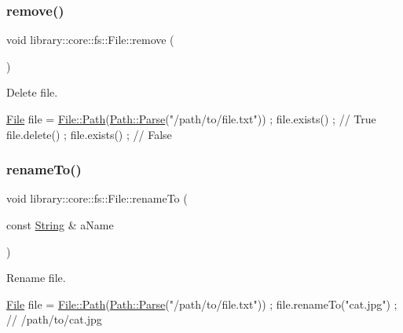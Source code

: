 \subsubsection{\texorpdfstring{remove()}{remove()}}
{\footnotesize\ttfamily void library\+::core\+::fs\+::\+File\+::remove (\begin{DoxyParamCaption}{ }\end{DoxyParamCaption})}



Delete file. 


\begin{DoxyCode}
\hyperlink{classlibrary_1_1core_1_1fs_1_1_file_a6f3f0d79545ac9984c6f49432f0c6c39}{File} file = \hyperlink{classlibrary_1_1core_1_1fs_1_1_file_a72d6cdf8bb7e299889c6149e2b8a6cc7}{File::Path}(\hyperlink{classlibrary_1_1core_1_1fs_1_1_path_a6ba644b6609507e724c217bf2020f5ae}{Path::Parse}(\textcolor{stringliteral}{"/path/to/file.txt"})) ;
file.exists() ; \textcolor{comment}{// True}
file.delete() ;
file.exists() ; \textcolor{comment}{// False}
\end{DoxyCode}
 \mbox{\label{classlibrary_1_1core_1_1fs_1_1_file_ae65190a612b6958e9e36238e3370c134}} 
\subsubsection{\texorpdfstring{rename\+To()}{renameTo()}}
{\footnotesize\ttfamily void library\+::core\+::fs\+::\+File\+::rename\+To (\begin{DoxyParamCaption}\item[{const \hyperlink{classlibrary_1_1core_1_1types_1_1_string}{String} \&}]{a\+Name }\end{DoxyParamCaption})}



Rename file. 


\begin{DoxyCode}
\hyperlink{classlibrary_1_1core_1_1fs_1_1_file_a6f3f0d79545ac9984c6f49432f0c6c39}{File} file = \hyperlink{classlibrary_1_1core_1_1fs_1_1_file_a72d6cdf8bb7e299889c6149e2b8a6cc7}{File::Path}(\hyperlink{classlibrary_1_1core_1_1fs_1_1_path_a6ba644b6609507e724c217bf2020f5ae}{Path::Parse}(\textcolor{stringliteral}{"/path/to/file.txt"})) ;
file.renameTo(\textcolor{stringliteral}{"cat.jpg"}) ; \textcolor{comment}{// /path/to/cat.jpg}
\end{DoxyCode}



